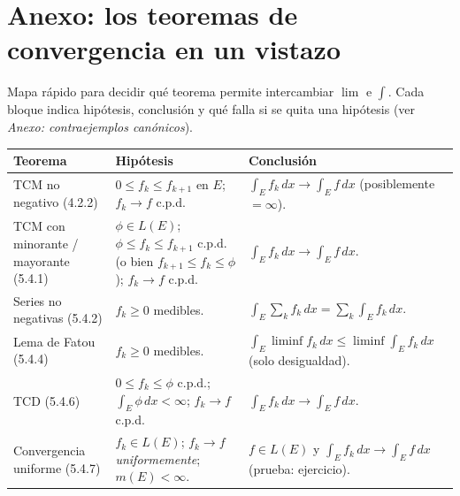 \documentclass[11pt,twoside]{article}
\begin{document}
\section{Anexo: los teoremas de convergencia en un vistazo}

Mapa rápido para decidir qué teorema permite intercambiar $\lim$ e $\int$. Cada bloque indica hipótesis, conclusión y qué falla si se quita una hipótesis (ver \emph{Anexo: contraejemplos canónicos}).

\medskip

\renewcommand{\arraystretch}{1.35}
\begin{longtable}{p{} p{} p{}}
\hline
\textbf{Teorema} & \textbf{Hipótesis} & \textbf{Conclusión} \\
\hline
\endhead

TCM no negativo (4.2.2) & $0 \leq f_{k} \leq f_{k+1}$ en $E$; $f_{k} \to f$ c.p.d. & $\int_{E} f_{k} \, dx \to \int_{E} f \, dx$ (posiblemente $= \infty$). \\
\hline
TCM con minorante / mayorante (5.4.1) & $\phi \in L(E)$; $\phi \leq f_{k} \leq f_{k+1}$ c.p.d. (o bien $f_{k+1} \leq f_{k} \leq \phi$); $f_{k} \to f$ c.p.d. & $\int_{E} f_{k} \, dx \to \int_{E} f \, dx$. \\
\hline
Series no negativas (5.4.2) & $f_{k} \geq 0$ medibles. & $\int_{E} \sum_{k} f_{k} \, dx = \sum_{k} \int_{E} f_{k} \, dx$. \\
\hline
Lema de Fatou (5.4.4) & $f_{k} \geq 0$ medibles. & $\int_{E} \liminf f_{k} \, dx \leq \liminf \int_{E} f_{k} \, dx$ (solo desigualdad). \\
\hline
TCD (5.4.6) & $0 \leq f_{k} \leq \phi$ c.p.d.; $\int_{E} \phi \, dx < \infty$; $f_{k} \to f$ c.p.d. & $\int_{E} f_{k} \, dx \to \int_{E} f \, dx$. \\
\hline
Convergencia uniforme (5.4.7) & $f_{k} \in L(E)$; $f_{k} \to f$ \emph{uniformemente}; $m(E) < \infty$. & $f \in L(E)$ y $\int_{E} f_{k} \, dx \to \int_{E} f \, dx$ (prueba: ejercicio). \\
\hline
\end{longtable}
\renewcommand{\arraystretch}{1.0}
\end{document}
